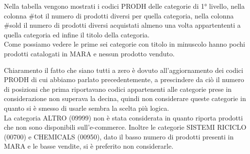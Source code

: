 \begin{minipage}[H]{0.4\textwidth}
\end{minipage}
\begin{minipage}[H]{0.6\textwidth}
	Nella tabella vengono mostrati i codici PRODH delle categorie di 1° livello, nella colonna \#tot il numero di prodotti diversi per quella categoria, nella colonna \#sold il numero di prodotti diversi acquistati almeno una volta appartententi a quella categoria ed infine il titolo della categoria.\\
	Come possiamo vedere le prime sei categorie con titolo in minuscolo hanno pochi prodotti catalogati in MARA e nessun prodotto venduto.\\
\end{minipage}
Chiaramento il fatto che siano tutti a zero è dovuto all'aggiornamento dei codici PRODH di cui abbiamo parlato precedentemente, a prescindere da ciò il numero di posizioni che prima riportavano codici appartenenti alle categorie prese in considerazione non superava la decina, quindi non considerare queste categorie in quanto si è smesso di usarle sembra la scelta più logica.\\
La categoria ALTRO (09999) non è stata considerata in quanto riporta prodotti che non sono disponibili sull'e-commerce.
Inoltre le categorie SISTEMI RICICLO (00700) e CHEMICALS (00950), dato il basso numero di prodotti presenti in MARA e le basse vendite, si è preferito non considerarle.
